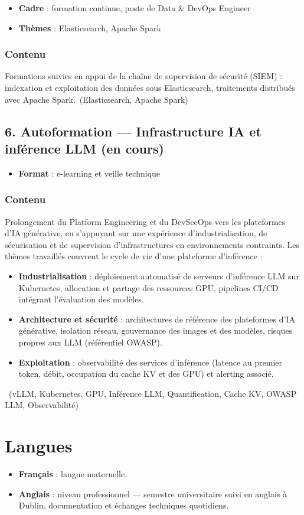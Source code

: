 \documentclass[11pt,a4paper]{article}
\newcommand{\stack}[1]{\ {\small\textcolor{accent}{(#1)}}}
\begin{document}
\begin{itemize}
  \item \textbf{Cadre} : formation continue, poste de Data \& DevOps Engineer
  \item \textbf{Thèmes} : Elasticsearch, Apache Spark
\end{itemize}

\subsubsection{Contenu}

Formations suivies en appui de la chaîne de supervision de sécurité (SIEM) : indexation et exploitation des données sous Elasticsearch, traitements distribués avec Apache Spark.\stack{Elasticsearch, Apache Spark}

\subsection{6. Autoformation --- Infrastructure IA et inférence LLM (en cours)}

\begin{itemize}
  \item \textbf{Format} : e-learning et veille technique
\end{itemize}

\subsubsection{Contenu}

Prolongement du Platform Engineering et du DevSecOps vers les plateformes d'IA générative, en s'appuyant sur une expérience d'industrialisation, de sécurisation et de supervision d'infrastructures en environnements contraints. Les thèmes travaillés couvrent le cycle de vie d'une plateforme d'inférence :

\begin{itemize}
  \item \textbf{Industrialisation} : déploiement automatisé de serveurs d'inférence LLM sur Kubernetes, allocation et partage des ressources GPU, pipelines CI/CD intégrant l'évaluation des modèles.
  \item \textbf{Architecture et sécurité} : architectures de référence des plateformes d'IA générative, isolation réseau, gouvernance des images et des modèles, risques propres aux LLM (référentiel OWASP).
  \item \textbf{Exploitation} : observabilité des services d'inférence (latence au premier token, débit, occupation du cache KV et des GPU) et alerting associé.
\end{itemize}
\stack{vLLM, Kubernetes, GPU, Inférence LLM, Quantification, Cache KV, OWASP LLM, Observabilité}

\section{Langues}

\begin{itemize}
  \item \textbf{Français} : langue maternelle.
  \item \textbf{Anglais} : niveau professionnel --- semestre universitaire suivi en anglais à Dublin, documentation et échanges techniques quotidiens.
\end{itemize}
\end{document}
